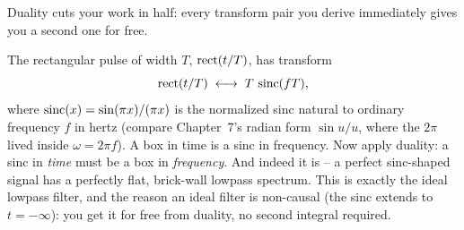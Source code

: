 Duality cuts your work in half: every transform pair you derive immediately
gives you a second one for free.

\begin{example}
\label{ch11:ex-rect-sinc}
The rectangular pulse of width $T$, $\operatorname{rect}(t/T)$, has transform
\[
\operatorname{rect}(t/T) \;\longleftrightarrow\; T\,\operatorname{sinc}(fT),
\]
where $\operatorname{sinc}(x) = \sin(\pi x)/(\pi x)$ is the normalized sinc natural to ordinary frequency $f$ in hertz (compare Chapter~7's radian form $\sin u / u$, where the $2\pi$ lived inside $\omega = 2\pi f$). A box in time is a sinc in frequency.
Now apply duality: a sinc in \emph{time} must be a box in \emph{frequency}. And
indeed it is -- a perfect sinc-shaped signal has a perfectly flat,
brick-wall lowpass spectrum. This is exactly the ideal lowpass filter, and the
reason an ideal filter is non-causal (the sinc extends to $t = -\infty$): you get
it for free from duality, no second integral required.

\begin{figure}[H]
\centering
{}
\hfill
{}

\vspace{0.3cm}


\end{figure}
\end{example}
